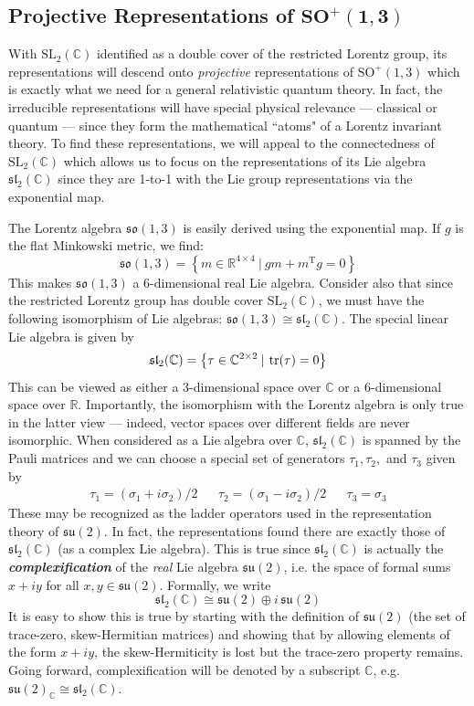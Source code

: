\documentclass[onecolumn]{gwclass}
\renewcommand{\t}[1]{\text{#1}}
\begin{document}
\subsection{Projective Representations of $\boldsymbol{\t{SO}^+(1,3)}$}
With $\t{SL}_2(\mathbb{C})$ identified as a double cover of the restricted Lorentz group, its representations will descend onto \emph{projective} representations of $\t{SO}^+(1,3)$ which is exactly what we need for a general relativistic quantum theory. In fact, the irreducible representations will have special physical relevance --- classical or quantum --- since they form the mathematical ``atoms" of a Lorentz invariant theory. To find these representations, we will appeal to the connectedness of $\t{SL}_2(\mathbb{C})$ which allows us to focus on the representations of its Lie algebra $\mathfrak{sl}_2(\mathbb{C})$ since they are 1-to-1 with the Lie group representations via the exponential map.

The Lorentz algebra $\mathfrak{so}(1,3)$ is easily derived using the exponential map. If $g$ is the flat Minkowski metric, we find:
$$ \mathfrak{so}(1,3) = \left\{ m\in \mathbb{R}^{4\times 4} \:|\: gm + m^\t{T}g = 0 \right\} $$
This makes $\mathfrak{so}(1,3)$ a 6-dimensional real Lie algebra. Consider also that since the restricted Lorentz group has double cover $\t{SL}_2(\mathbb{C})$, we must have the following isomorphism of Lie algebras: $\mathfrak{so}(1,3)\cong \mathfrak{sl}_2(\mathbb{C})$. The special linear Lie algebra is given by
$$ \mathfrak{sl}_2(\mathbb{C}) = \left\{ \tau\in\mathbb{C}^{2\times 2}\:|\: \tr(\tau) = 0 \right\} $$
This can be viewed as either a 3-dimensional space over $\mathbb{C}$ or a 6-dimensional space over $\mathbb{R}$. Importantly, the isomorphism with the Lorentz algebra is only true in the latter view --- indeed, vector spaces over different fields are never isomorphic. When considered as a Lie algebra over $\mathbb{C}$, $\mathfrak{sl}_2(\mathbb{C})$ is spanned by the Pauli matrices and we can choose a special set of generators $\tau_1, \tau_2,$ and $\tau_3$ given by
\begin{align*}
	\tau_1 = (\sigma_1 + i\sigma_2)/2 && \tau_2 = (\sigma_1 - i\sigma_2)/2 && \tau_3 = \sigma_3
\end{align*}
These may be recognized as the ladder operators used in the representation theory of $\mathfrak{su}(2)$. In fact, the representations found there are exactly those of $\mathfrak{sl}_2(\mathbb{C})$ (as a complex Lie algebra). This is true since $\mathfrak{sl}_2(\mathbb{C})$ is actually the \textbf{\emph{complexification}} of the \emph{real} Lie algebra $\mathfrak{su}(2)$, i.e. the space of formal sums $x+iy$ for all $x,y\in\mathfrak{su}(2)$. Formally, we write
$$ \mathfrak{sl}_2(\mathbb{C}) \cong \mathfrak{su}(2) \oplus i\,\mathfrak{su}(2)$$
It is easy to show this is true by starting with the definition of $\mathfrak{su}(2)$ (the set of trace-zero, skew-Hermitian matrices) and showing that by allowing elements of the form $x+iy$, the skew-Hermiticity is lost but the trace-zero property remains. Going forward, complexification will be denoted by a subscript $\mathbb{C}$, e.g. $\mathfrak{su}(2)_\mathbb{C}\cong\mathfrak{sl}_2(\mathbb{C})$.
\end{document}
